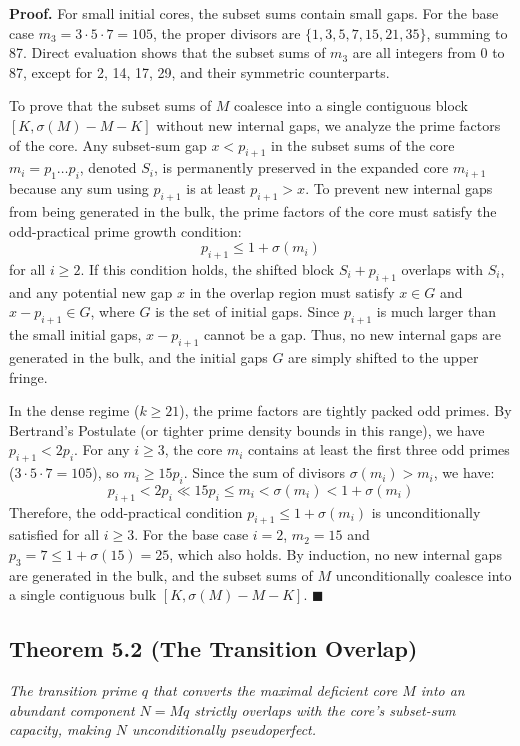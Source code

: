 \documentclass{erdos_paper}
\begin{document}
\textbf{Proof.} For small initial cores, the subset sums contain small gaps. For the base case $m_3 = 3 \cdot 5 \cdot 7 = 105$, the proper divisors are $\{1, 3, 5, 7, 15, 21, 35\}$, summing to 87. Direct evaluation shows that the subset sums of $m_3$ are all integers from 0 to 87, except for 2, 14, 17, 29, and their symmetric counterparts.

To prove that the subset sums of $M$ coalesce into a single contiguous block $[K, \sigma(M) - M - K]$ without new internal gaps, we analyze the prime factors of the core. Any subset-sum gap $x < p_{i+1}$ in the subset sums of the core $m_i = p_1 \dots p_i$, denoted $S_i$, is permanently preserved in the expanded core $m_{i+1}$ because any sum using $p_{i+1}$ is at least $p_{i+1} > x$. To prevent new internal gaps from being generated in the bulk, the prime factors of the core must satisfy the odd-practical prime growth condition:
$$ p_{i+1} \le 1 + \sigma(m_i) $$
for all $i \ge 2$. If this condition holds, the shifted block $S_i + p_{i+1}$ overlaps with $S_i$, and any potential new gap $x$ in the overlap region must satisfy $x \in G$ and $x - p_{i+1} \in G$, where $G$ is the set of initial gaps. Since $p_{i+1}$ is much larger than the small initial gaps, $x - p_{i+1}$ cannot be a gap. Thus, no new internal gaps are generated in the bulk, and the initial gaps $G$ are simply shifted to the upper fringe.

In the dense regime ($k \ge 21$), the prime factors are tightly packed odd primes. By Bertrand's Postulate (or tighter prime density bounds in this range), we have $p_{i+1} < 2 p_i$. For any $i \ge 3$, the core $m_i$ contains at least the first three odd primes ($3 \cdot 5 \cdot 7 = 105$), so $m_i \ge 15 p_i$. Since the sum of divisors $\sigma(m_i) > m_i$, we have:
$$ p_{i+1} < 2 p_i \ll 15 p_i \le m_i < \sigma(m_i) < 1 + \sigma(m_i) $$
Therefore, the odd-practical condition $p_{i+1} \le 1 + \sigma(m_i)$ is unconditionally satisfied for all $i \ge 3$. For the base case $i=2$, $m_2 = 15$ and $p_3 = 7 \le 1 + \sigma(15) = 25$, which also holds. By induction, no new internal gaps are generated in the bulk, and the subset sums of $M$ unconditionally coalesce into a single contiguous bulk $[K, \sigma(M) - M - K]$. $\blacksquare$

\subsection{Theorem 5.2 (The Transition Overlap)}
\textit{The transition prime $q$ that converts the maximal deficient core $M$ into an abundant component $N = Mq$ strictly overlaps with the core's subset-sum capacity, making $N$ unconditionally pseudoperfect.}
\end{document}
